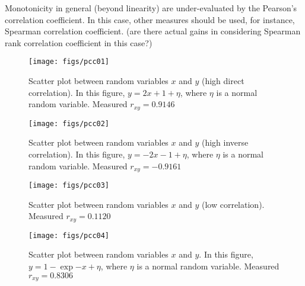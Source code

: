 Monotonicity in general (beyond linearity) are under-evaluated by the Pearson's correlation coefficient. In this case, other measures should be used, for instance, Spearman correlation coefficient. (are there actual gains in considering Spearman rank correlation coefficient in this case?)
\begin{figure}
	\texttt{[image: figs/pcc01]}
	\caption{Scatter plot between random variables $x$ and $y$ (high direct correlation). In this figure, $y = 2x+1+\eta$, where $\eta$ is a normal random variable. Measured $r_{xy}=0.9146$}
	\label{fig:pcc01}
\end{figure}

\begin{figure}
	\texttt{[image: figs/pcc02]}
	\caption{Scatter plot between random variables $x$ and $y$ (high inverse correlation). In this figure, $y = -2x-1+\eta$, where $\eta$ is a normal random variable. Measured $r_{xy}=-0.9161$}
	\label{fig:pcc02}
\end{figure}

\begin{figure}
	\texttt{[image: figs/pcc03]}
	\caption{Scatter plot between random variables $x$ and $y$ (low correlation). Measured $r_{xy}=0.1120$}
	\label{fig:pcc03}
\end{figure}

\begin{figure}
	\texttt{[image: figs/pcc04]}
	\caption{Scatter plot between random variables $x$ and $y$. In this figure, $y = 1-\exp{-x}+\eta$, where $\eta$ is a normal random variable. Measured $r_{xy}=0.8306$}
	\label{fig:pcc04}
\end{figure}
%
%
